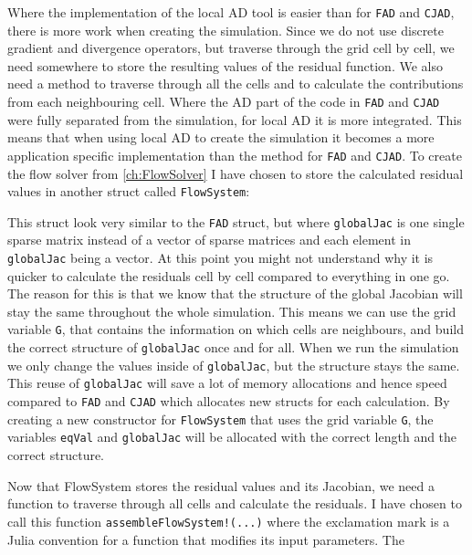 Where the implementation of the local AD tool is easier than for \texttt{FAD} and \texttt{CJAD}, there is more work when creating the simulation. Since we do not use discrete gradient and divergence operators, but traverse through the grid cell by cell, we need somewhere to store the resulting values of the residual function. We also need a method to traverse through all the cells and to calculate the contributions from each neighbouring cell. Where the AD part of the code in \texttt{FAD} and \texttt{CJAD} were fully separated from the simulation, for local AD it is more integrated. This means that when using local AD to create the simulation it becomes a more application specific implementation than the method for \texttt{FAD} and \texttt{CJAD}. To create the flow solver from \autoref{ch:FlowSolver} I have chosen to store the calculated residual values in another struct called \texttt{FlowSystem}:

This struct look very similar to the \texttt{FAD} struct, but where \texttt{globalJac} is one single sparse matrix instead of a vector of sparse matrices and each element in \texttt{globalJac} being a vector. At this point you might not understand why it is quicker to calculate the residuals cell by cell compared to everything in one go. The reason for this is that we know that the structure of the global Jacobian will stay the same throughout the whole simulation. This means we can use the grid variable \texttt{G}, that contains the information on which cells are neighbours, and build the correct structure of \texttt{globalJac} once and for all. When we run the simulation we only change the values inside of \texttt{globalJac}, but the structure stays the same. This reuse of \texttt{globalJac} will save a lot of memory allocations and hence speed compared to \texttt{FAD} and \texttt{CJAD} which allocates new structs for each calculation. By creating a new constructor for \texttt{FlowSystem} that uses the grid variable \texttt{G}, the variables \texttt{eqVal} and \texttt{globalJac} will be allocated with the correct length and the correct structure.

Now that FlowSystem stores the residual values and its Jacobian, we need a function to traverse through all cells and calculate the residuals.  I have chosen to call this function \texttt{assembleFlowSystem!(...)} where the exclamation mark is a Julia convention for a function that modifies its input parameters. The 



